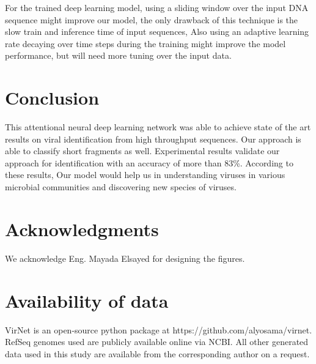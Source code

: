 \documentclass[conference]{IEEEtran}
\begin{document}
For the trained deep learning model, using a sliding window over the input DNA sequence might improve our model, the only drawback of this technique is the slow train and inference time of input sequences, Also using an adaptive learning rate decaying over time steps during the training might improve the model performance, but will need more tuning over the input data.

\section{Conclusion}

This attentional neural deep learning network was able to achieve state of the art results on viral identification from high throughput sequences. Our approach is able to classify short fragments as well. Experimental results validate our approach for identification with an accuracy of more than 83\%. According to these results, Our model would help us in understanding viruses in various microbial communities and discovering new species of viruses.


\section*{Acknowledgments}

We acknowledge Eng. Mayada Elsayed for designing the figures.


\section*{Availability of data}

VirNet is an open-source python package at https://github.com/alyosama/virnet. RefSeq genomes used are publicly available online via NCBI. All other generated data used in this study are available from the corresponding author on a request. 




\end{document}
